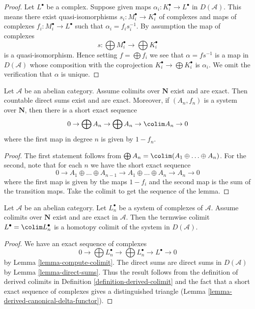 \begin{proof}
Let $L^\bullet$ be a complex. Suppose given maps
$\alpha_i : K_i^\bullet \to L^\bullet$ in $D(\mathcal{A})$.
This means there exist quasi-isomorphisms
$s_i : M_i^\bullet \to K_i^\bullet$
of complexes and maps of complexes $f_i : M_i^\bullet \to L^\bullet$
such that $\alpha_i = f_is_i^{-1}$. By assumption the map of complexes
$$
s : \bigoplus M_i^\bullet \longrightarrow \bigoplus K_i^\bullet
$$
is a quasi-isomorphism. Hence setting $f = \bigoplus f_i$ we see that
$\alpha = fs^{-1}$ is a map in $D(\mathcal{A})$ whose composition
with the coprojection $K_i^\bullet \to \bigoplus K_i^\bullet$ is $\alpha_i$.
We omit the verification that $\alpha$ is unique.
\end{proof}

\begin{lemma}
\label{lemma-compute-colimit}
Let $\mathcal{A}$ be an abelian category. Assume colimits over $\mathbf{N}$
exist and are exact. Then countable direct sums exist and are exact.
Moreover, if $(A_n, f_n)$ is a system over $\mathbf{N}$, then there is
a short exact sequence
$$
0 \to \bigoplus A_n \to \bigoplus A_n \to \colim A_n \to 0
$$
where the first map in degree $n$ is given by $1 - f_n$.
\end{lemma}

\begin{proof}
The first statement follows from
$\bigoplus A_n = \colim (A_1 \oplus \ldots \oplus A_n)$.
For the second, note that for each $n$ we have the short exact sequence
$$
0 \to
A_1 \oplus \ldots \oplus A_{n - 1} \to
A_1 \oplus \ldots \oplus A_n \to A_n \to 0
$$
where the first map is given by the maps $1 - f_i$ and the
second map is the sum of the transition maps.
Take the colimit to get the sequence of the lemma.
\end{proof}

\begin{lemma}
\label{lemma-colim-hocolim}
Let $\mathcal{A}$ be an abelian category. Let $L_n^\bullet$
be a system of complexes of $\mathcal{A}$. Assume
colimits over $\mathbf{N}$ exist and are exact in $\mathcal{A}$.
Then the termwise
colimit $L^\bullet = \colim L_n^\bullet$ is a homotopy colimit of the
system in $D(\mathcal{A})$.
\end{lemma}

\begin{proof}
We have an exact sequence of complexes
$$
0 \to \bigoplus L_n^\bullet \to \bigoplus L_n^\bullet \to L^\bullet \to 0
$$
by Lemma \ref{lemma-compute-colimit}.
The direct sums are direct sums in $D(\mathcal{A})$ by
Lemma \ref{lemma-direct-sums}.
Thus the result follows from the definition
of derived colimits in
Definition \ref{definition-derived-colimit}
and the fact that a short exact sequence of complexes
gives a distinguished triangle
(Lemma \ref{lemma-derived-canonical-delta-functor}).
\end{proof}

